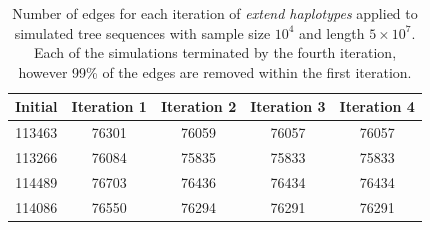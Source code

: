 \documentclass[10pt,twoside,lineno]{gsajnl}
\begin{document}
\begin{table}[hbt]
\begin{center}
\begin{tabular}{|c|c|c|c|c|}
	\hline
	Initial & Iteration 1 & Iteration 2 & Iteration 3 & Iteration 4 \\
	\hline
	\hline
	113463	&	76301	&	76059	&	76057	&	76057 \\
	\hline
	113266 & 76084	&	75835	&	75833	&	75833 \\
	\hline
	114489 & 76703 & 76436 & 76434 & 76434 \\
	\hline
	114086	& 76550	& 76294	& 76291	& 76291\\
	\hline
\end{tabular}
\caption{Number of edges for each iteration of \textit{extend haplotypes} applied to 
simulated tree sequences with sample size $10^4$ and length $5\times 10^7$. 
Each of the simulations terminated by the fourth iteration, however 99\% of the edges
are removed within the first iteration.}
\label{tab:edge-counts}
\end{center}
\end{table}
\end{document}

